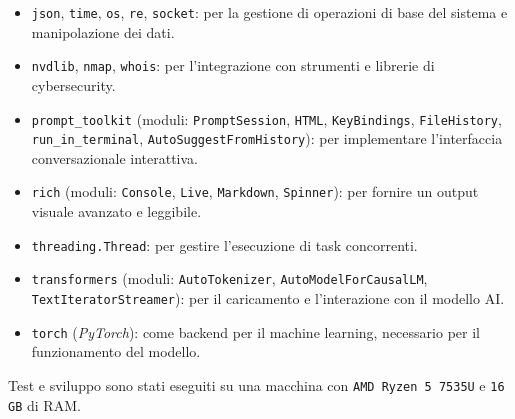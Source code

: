 \documentclass[11pt]{article}
\begin{document}
\begin{itemize}
    \item \texttt{json}, \texttt{time}, \texttt{os}, \texttt{re}, \texttt{socket}: per la gestione di operazioni di base del sistema e manipolazione dei dati.
    \item \texttt{nvdlib}, \texttt{nmap}, \texttt{whois}: per l'integrazione con strumenti e librerie di cybersecurity.
    \item \texttt{prompt\_toolkit} (moduli: \texttt{PromptSession}, \texttt{HTML}, \texttt{KeyBindings}, \texttt{FileHistory}, \texttt{run\_in\_terminal}, \texttt{AutoSuggestFromHistory}): per implementare l'interfaccia conversazionale interattiva.
    \item \texttt{rich} (moduli: \texttt{Console}, \texttt{Live}, \texttt{Markdown}, \texttt{Spinner}): per fornire un output visuale avanzato e leggibile.
    \item \texttt{threading.Thread}: per gestire l'esecuzione di task concorrenti.
    \item \texttt{transformers} (moduli: \texttt{AutoTokenizer}, \texttt{AutoModelForCausalLM}, \texttt{TextIteratorStreamer}): per il caricamento e l'interazione con il modello AI.
    \item \texttt{torch} (\textit{PyTorch}): come backend per il machine learning, necessario per il funzionamento del modello.
\end{itemize}

Test e sviluppo sono stati eseguiti su una macchina con \texttt{AMD Ryzen 5 7535U} e \texttt{16 GB} di RAM.

\newpage
\printbibliography
\end{document}
